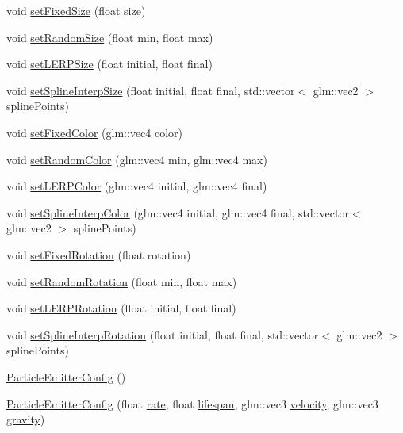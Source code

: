 \begin{DoxyCompactItemize}
void \hyperlink{struct_mason_1_1_particle_emitter_config_a52313455114fadb6609232719681b4d7}{set\+Fixed\+Size} (float size)
\item 
void \hyperlink{struct_mason_1_1_particle_emitter_config_ab644fd902c0e29f758a53912d0784f19}{set\+Random\+Size} (float min, float max)
\item 
void \hyperlink{struct_mason_1_1_particle_emitter_config_a5495ec9be73c80df30115461b6af7733}{set\+L\+E\+R\+P\+Size} (float initial, float final)
\item 
void \hyperlink{struct_mason_1_1_particle_emitter_config_a4288325ce9dcf3437fbcabaf99f968b4}{set\+Spline\+Interp\+Size} (float initial, float final, std\+::vector$<$ glm\+::vec2 $>$ spline\+Points)
\item 
void \hyperlink{struct_mason_1_1_particle_emitter_config_ae4aa09d5feb556808fba6c23167d9d78}{set\+Fixed\+Color} (glm\+::vec4 color)
\item 
void \hyperlink{struct_mason_1_1_particle_emitter_config_a5317af2f90691360678a2663a747c36d}{set\+Random\+Color} (glm\+::vec4 min, glm\+::vec4 max)
\item 
void \hyperlink{struct_mason_1_1_particle_emitter_config_a09620b4edcadd022cd8a447da17867a0}{set\+L\+E\+R\+P\+Color} (glm\+::vec4 initial, glm\+::vec4 final)
\item 
void \hyperlink{struct_mason_1_1_particle_emitter_config_aaf515319a62060a75edbb1e7b6403ff2}{set\+Spline\+Interp\+Color} (glm\+::vec4 initial, glm\+::vec4 final, std\+::vector$<$ glm\+::vec2 $>$ spline\+Points)
\item 
void \hyperlink{struct_mason_1_1_particle_emitter_config_acb790846d2a00fd97160fdac66589fd5}{set\+Fixed\+Rotation} (float rotation)
\item 
void \hyperlink{struct_mason_1_1_particle_emitter_config_a463adb67fe4ee1732daa20e9d01d2331}{set\+Random\+Rotation} (float min, float max)
\item 
void \hyperlink{struct_mason_1_1_particle_emitter_config_ad96c857c3ceac520462a10981e471c4b}{set\+L\+E\+R\+P\+Rotation} (float initial, float final)
\item 
void \hyperlink{struct_mason_1_1_particle_emitter_config_abcaf3368ccf9b524538a3cf3fadb15d2}{set\+Spline\+Interp\+Rotation} (float initial, float final, std\+::vector$<$ glm\+::vec2 $>$ spline\+Points)
\item 
\hyperlink{struct_mason_1_1_particle_emitter_config_a317aa2e9d325160e20fd1bbefdc244f5}{Particle\+Emitter\+Config} ()
\item 
\hyperlink{struct_mason_1_1_particle_emitter_config_a50ce1e6e4420674c75b12b402ac5bf33}{Particle\+Emitter\+Config} (float \hyperlink{struct_mason_1_1_particle_emitter_config_abc0c7231f9134e3b0456d22ee8d5c8a2}{rate}, float \hyperlink{struct_mason_1_1_particle_emitter_config_a856b3906e25a7d41eb9bc7e37a91ef93}{lifespan}, glm\+::vec3 \hyperlink{struct_mason_1_1_particle_emitter_config_af8c3efa305e0a0636576bebe60938c80}{velocity}, glm\+::vec3 \hyperlink{struct_mason_1_1_particle_emitter_config_ad5fa0930e4e3f5d8c9de1324a854e63a}{gravity})
\end{DoxyCompactItemize}
